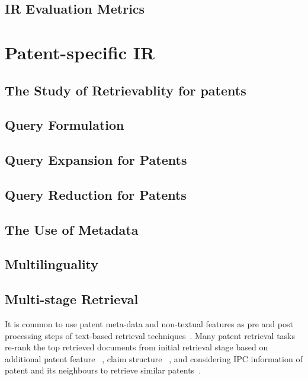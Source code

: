 \subsection{IR Evaluation Metrics}



\section{Patent-specific IR}
\label{subsec:patentir}

\subsection{The Study of Retrievablity for patents}


\subsection{Query Formulation}


\subsection{Query Expansion for Patents}


\subsection{Query Reduction for Patents}


%

\subsection{The Use of Metadata}

\label{sec:metadata}

\subsection{Multilinguality}


\subsection{Multi-stage Retrieval}
It is common to use patent meta-data and non-textual features as pre and post processing steps of text-based retrieval techniques~\citep{lopez2009multiple}. Many patent retrieval tasks re-rank the top retrieved documents from initial retrieval stage based on additional patent feature ~\citep{lopez2010experiments}, claim structure ~\citep{mase2005proposal}, and considering IPC information of patent and its neighbours to retrieve similar patents~\citep{verma2011exploring}. 

